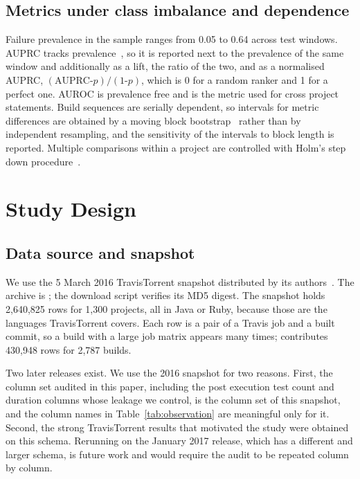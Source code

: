 \documentclass[sigconf,review,anonymous,nonacm]{acmart}
\newcommand{\proj}[1]{\path{#1}}
\newcommand{\mns}{\text{-}}
\begin{document}
\subsection{Metrics under class imbalance and dependence}
\label{sec:related-metrics}

Failure prevalence in the sample ranges from 0.05 to 0.64 across test windows. AUPRC tracks prevalence~\cite{davis2006, saito2015}, so it is reported next to the prevalence of the same window and additionally as a lift, the ratio of the two, and as a normalised AUPRC, $(\mathrm{AUPRC} \mns p)/(1 \mns p)$, which is 0 for a random ranker and 1 for a perfect one. AUROC is prevalence free and is the metric used for cross project statements. Build sequences are serially dependent, so intervals for metric differences are obtained by a moving block bootstrap~\cite{kunsch1989, politis1994} rather than by independent resampling, and the sensitivity of the intervals to block length is reported. Multiple comparisons within a project are controlled with Holm's step down procedure~\cite{holm1979}.

\section{Study Design}
\label{sec:design}

\subsection{Data source and snapshot}
\label{sec:design-data}

We use the 5 March 2016 TravisTorrent snapshot distributed by its authors~\cite{beller2017travistorrent}. The archive is ; the download script verifies its MD5 digest. The snapshot holds 2{,}640{,}825 rows for 1{,}300 projects, all in Java or Ruby, because those are the languages TravisTorrent covers. Each row is a pair of a Travis job and a built commit, so a build with a large job matrix appears many times; \proj{rails/rails} contributes 430{,}948 rows for 2{,}787 builds.

Two later releases exist. We use the 2016 snapshot for two reasons. First, the column set audited in this paper, including the post execution test count and duration columns whose leakage we control, is the column set of this snapshot, and the column names in Table~\ref{tab:observation} are meaningful only for it. Second, the strong TravisTorrent results that motivated the study were obtained on this schema. Rerunning on the January 2017 release, which has a different and larger schema, is future work and would require the audit to be repeated column by column.
\end{document}
